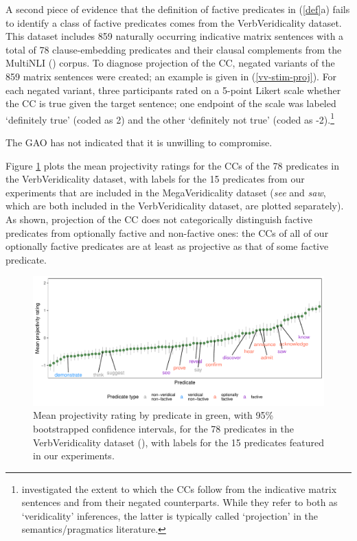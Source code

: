 \documentclass[11pt,fleqn]{article}
\newcommand{\6}{\mbox{$[\hspace*{-.6mm}[$}}
\newcommand{\9}{\mbox{$]\hspace*{-.6mm}]$}}
\begin{document}
A second piece of evidence that the definition of factive predicates in (\ref{def}a) fails to identify a class of factive predicates comes from the VerbVeridicality dataset. This dataset includes 859 naturally occurring indicative matrix sentences with a total of 78 clause-embedding predicates and their clausal complements from the MultiNLI (\citealt{williams-etal2018}) corpus. To diagnose projection of the CC, negated variants of the 859 matrix sentences were created; an example is given in (\ref{vv-stim-proj}). For each negated variant, three participants rated on a 5-point Likert scale whether the CC is true given the target sentence; one endpoint of the scale was labeled `definitely true' (coded as 2) and the other `definitely not true' (coded as -2).\footnote{\citealt{ross-pavlick2019} investigated the extent to which the CCs follow from the indicative matrix sentences and from their negated counterparts. While they refer to both as `veridicality' inferences, the latter is typically called `projection' in the semantics/pragmatics literature.}

\begin{exe}
\ex\label{vv-stim-proj} The GAO has not indicated that it is unwilling to compromise.
\end{exe}

Figure \ref{f-vv-projectivity} plots the mean projectivity ratings for the CCs of the 78 predicates in the VerbVeridicality dataset, with labels for the 15 predicates from our experiments that are included in the MegaVeridicality dataset ({\em see} and {\em saw}, which are both included in the VerbVeridicality dataset, are plotted separately). As shown, projection of the CC does not categorically distinguish factive predicates from optionally factive and non-factive ones: the CCs of all of our optionally factive predicates are at least as projective as that of some factive predicate. 

\begin{figure}[H]
\centering
\includegraphics[width=.77\paperwidth]{../../VerbVeridicality-analysis/graphs/means-projection-by-predicate}

\caption{Mean projectivity rating by predicate in green, with 95\% bootstrapped confidence intervals, for the 78 predicates in the VerbVeridicality dataset (\citealt{ross-pavlick2019}), with labels for the 15 predicates featured in our experiments.}
\label{f-vv-projectivity}
\end{figure}
\end{document}
